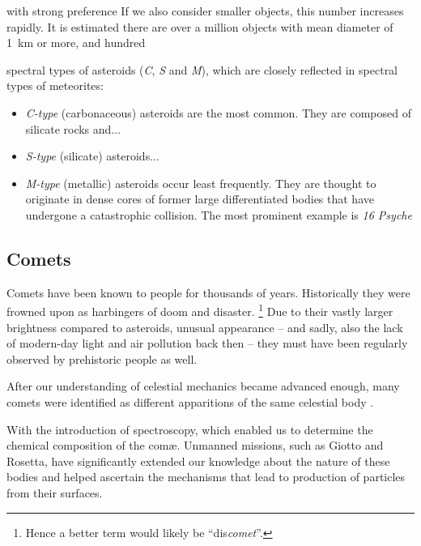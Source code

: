         with strong preference 
        If we also consider smaller objects, this number increases rapidly.
        It is estimated \citep{???} there are over a million objects with mean diameter of \SI{1}{\kilo\metre} or more,
        and hundred

        spectral types of asteroids (\emph{C}, \emph{S} and \emph{M}), which are closely reflected in
        spectral types of meteorites:

        \begin{itemize}
            \item \emph{C-type} (carbonaceous) asteroids are the most common. They are composed of silicate rocks and... 
            \item \emph{S-type} (silicate) asteroids... 
            \item \emph{M-type} (metallic) asteroids occur least frequently.
                They are thought to originate in dense cores of former large differentiated bodies that have
                undergone a catastrophic collision.
                The most prominent example is \emph{16 Psyche} \citep{???}
        \end{itemize}


    \subsection{Comets} \label{iac}

        Comets have been known to people for thousands of years. Historically they were
        frowned upon as harbingers of doom and disaster.%
        \footnote{Hence a better term would likely be ``dis\textit{comet}''.}
        Due to their vastly larger brightness compared to asteroids, unusual appearance -- and sadly, also the
        lack of modern-day light and air pollution back then -- they must have been regularly observed by prehistoric people as well.

        After our understanding of celestial mechanics became advanced enough,
        many comets were identified as different apparitions of the same celestial body \citep{nasa-halley}.

        With the introduction of spectroscopy, which enabled us to determine the chemical composition
        of the com\ae. Unmanned missions, such as Giotto and Rosetta, have significantly extended our knowledge
        about the nature of these bodies and helped ascertain the mechanisms that lead to production of particles from their surfaces.

